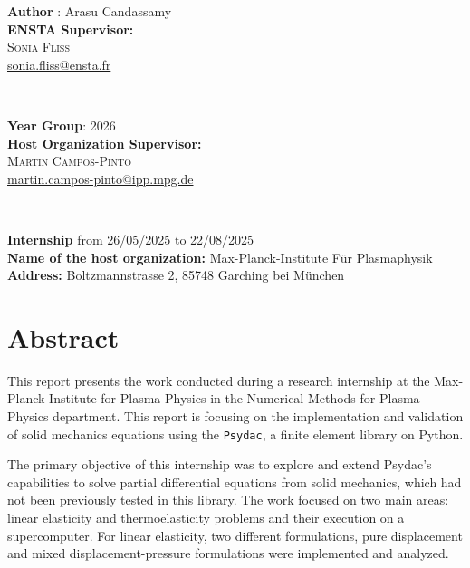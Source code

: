 \documentclass[a4paper,12pt,twoside]{report}
\begin{document}
\begin{minipage}[t]{0.5\textwidth}
	\begin{flushleft} 
    \textbf{Author} : Arasu Candassamy \\
    \vspace{1cm}
	\textbf{ENSTA Supervisor:}\\
	\textsc{Sonia Fliss}\\
	\href{mailto:sonia.fliss@ensta.fr}{sonia.fliss@ensta.fr}
	\end{flushleft}
\end{minipage}
~
\begin{minipage}[t]{0.4\textwidth}
	\begin{flushright} 
    \textbf{Year Group}: 2026 \\
    \vspace{1cm}
	\textbf{Host Organization Supervisor:}\\
	\textsc{Martin Campos-Pinto}\\
	\href{mailto:martin.campos-pinto@ipp.mpg.de}{martin.campos-pinto@ipp.mpg.de}\\
	\end{flushright}
\end{minipage} \\

\vspace{1cm}

\begin{center}
    \textbf{Internship} from 26/05/2025 to 22/08/2025\\
\textbf{Name of the host organization:} Max-Planck-Institute Für Plasmaphysik\\
\textbf{Address:} Boltzmannstrasse 2, 85748 Garching bei München
\end{center}


\newpage\null

\newpage
\section*{Abstract}

This report presents the work conducted during a research internship at the Max-Planck Institute for Plasma Physics in the Numerical Methods for Plasma Physics department. This report is focusing on the implementation and validation of solid mechanics equations using the \texttt{Psydac}, a finite element library on Python.

The primary objective of this internship was to explore and extend Psydac's capabilities to solve partial differential equations from solid mechanics, which had not been previously tested in this library. The work focused on two main areas: linear elasticity and thermoelasticity problems and their execution on a supercomputer. For linear elasticity, two different formulations, pure displacement and mixed displacement-pressure formulations were implemented and analyzed. 
\end{document}
